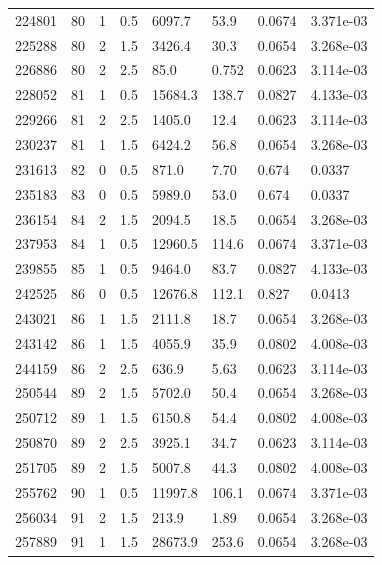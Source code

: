 \documentclass[preview]{standalone}
\begin{document}
{{{\begin{tabular}{L{1.2cm}C{1.2cm} C{0.3cm}C{0.5cm} C{1.4cm}C{1.4cm} C{1.4cm}C{1.4cm}}
  224801  &    80  & 1     & 0.5 &  6097.7  & 53.9  & 0.0674 &  3.371e-03   \\ 
  225288  &    80  & 2     & 1.5 &  3426.4  & 30.3  & 0.0654 &  3.268e-03   \\ 
  226886  &    80  & 2     & 2.5 &  85.0  & 0.752  & 0.0623 &  3.114e-03   \\ 
  228052  &    81  & 1     & 0.5 &  15684.3  & 138.7  & 0.0827 &  4.133e-03   \\ 
  229266  &    81  & 2     & 2.5 &  1405.0  & 12.4  & 0.0623 &  3.114e-03   \\ 
  230237  &    81  & 1     & 1.5 &  6424.2  & 56.8  & 0.0654 &  3.268e-03   \\ 
  231613  &    82  & 0     & 0.5 &  871.0  & 7.70  & 0.674 &  0.0337   \\ 
  235183  &    83  & 0     & 0.5 &  5989.0  & 53.0  & 0.674 &  0.0337   \\ 
  236154  &    84  & 2     & 1.5 &  2094.5  & 18.5  & 0.0654 &  3.268e-03   \\ 
  237953  &    84  & 1     & 0.5 &  12960.5  & 114.6  & 0.0674 &  3.371e-03   \\ 
  239855  &    85  & 1     & 0.5 &  9464.0  & 83.7  & 0.0827 &  4.133e-03   \\ 
  242525  &    86  & 0     & 0.5 &  12676.8  & 112.1  & 0.827 &  0.0413   \\ 
  243021  &    86  & 1     & 1.5 &  2111.8  & 18.7  & 0.0654 &  3.268e-03   \\ 
  243142  &    86  & 1     & 1.5 &  4055.9  & 35.9  & 0.0802 &  4.008e-03   \\ 
  244159  &    86  & 2     & 2.5 &  636.9  & 5.63  & 0.0623 &  3.114e-03   \\ 
  250544  &    89  & 2     & 1.5 &  5702.0  & 50.4  & 0.0654 &  3.268e-03   \\ 
  250712  &    89  & 1     & 1.5 &  6150.8  & 54.4  & 0.0802 &  4.008e-03   \\ 
  250870  &    89  & 2     & 2.5 &  3925.1  & 34.7  & 0.0623 &  3.114e-03   \\ 
  251705  &    89  & 2     & 1.5 &  5007.8  & 44.3  & 0.0802 &  4.008e-03   \\ 
  255762  &    90  & 1     & 0.5 &  11997.8  & 106.1  & 0.0674 &  3.371e-03   \\ 
  256034  &    91  & 2     & 1.5 &  213.9  & 1.89  & 0.0654 &  3.268e-03   \\ 
  257889  &    91  & 1     & 1.5 &  28673.9  & 253.6  & 0.0654 &  3.268e-03   \\ 

\end{tabular}}}}
\end{document}
